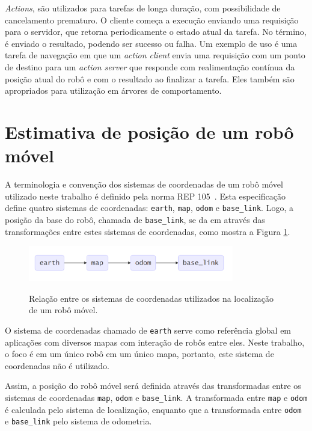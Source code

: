 \documentclass[repeatfields,xlists,xpacks,oneside,yearsonly]{ufrgscca}
\begin{document}
\textit{Actions}, são utilizados para tarefas de longa duração, com possibilidade de
cancelamento prematuro.
O cliente começa a execução enviando uma requisição para o servidor,
que retorna periodicamente o estado atual da tarefa.
No término, é enviado o resultado, podendo ser sucesso ou falha.
Um exemplo de uso é uma tarefa de navegação em que um \textit{action client}
envia uma requisição com um ponto de destino para um \textit{action server}
que responde com realimentação contínua da posição atual do robô e
com o resultado ao finalizar a tarefa.
Eles também são apropriados para utilização em árvores de comportamento.

\section{Estimativa de posição de um robô móvel}

A terminologia e convenção dos sistemas de coordenadas de um robô
móvel utilizado neste trabalho é definido pela norma REP
105~\cite{rep_105}. Esta especificação define quatro sistemas de
coordenadas: \texttt{earth}, \texttt{map}, \texttt{odom} e
\texttt{base\_link}. Logo, a posição da base do robô, chamada de
\texttt{base\_link}, se da em através das transformações entre estes
sistemas de coordenadas, como mostra a Figura \ref{fig:rep_105}.

\begin{figure}[h]
    {
        \centering
        \caption{Relação entre os sistemas de coordenadas utilizados na localização de um robô móvel.}
        \label{fig:rep_105}
        \includegraphics[width=0.8\textwidth]{tf_rep_105.png}\\
    }
    {}
\end{figure}

O sistema de coordenadas chamado de \texttt{earth} serve como
referência global em aplicações com diversos mapas com interação de
robôs entre eles. Neste trabalho, o foco é em um único robô em um
único mapa, portanto, este sistema de coordenadas não é utilizado.

Assim, a posição do robô móvel será definida através das
transformadas entre os sistemas de coordenadas \texttt{map},
\texttt{odom} e \texttt{base\_link}. A transformada entre
\texttt{map} e \texttt{odom} é calculada pelo sistema de localização,
enquanto que a transformada entre \texttt{odom} e \texttt{base\_link}
pelo sistema de odometria.
\end{document}
